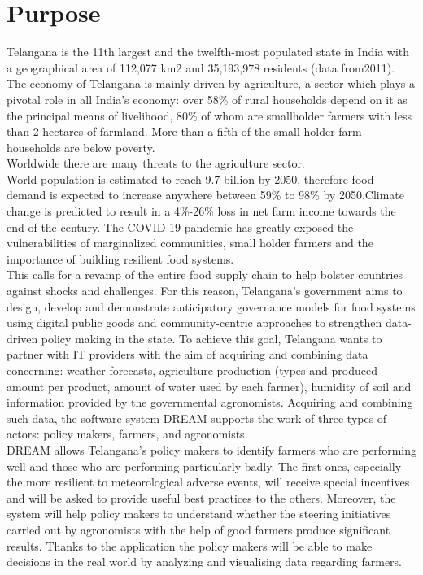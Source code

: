 \section{Purpose}

Telangana is the 11th largest and the twelfth-most populated state in India with a geographical area of 112,077 km2 and 35,193,978 residents (data from2011).
The economy of Telangana is mainly driven by agriculture, a sector which plays a pivotal role in all India’s economy: over 58\% of rural households depend on it as the principal means of livelihood, 80\% of whom are smallholder farmers with less than 2 hectares of farmland. More than a fifth of the small-holder farm households are below poverty. \\

Worldwide there are many threats to the agriculture sector.\\ World population is estimated to reach 9.7 billion by 2050, therefore food demand is expected to increase anywhere between 59\% to 98\% by 2050.Climate change is predicted to result in a 4\%-26\% loss in net farm income towards the end of the century. The COVID-19 pandemic has greatly exposed the vulnerabilities of marginalized communities, small holder farmers and the importance of building resilient food systems.\\

This calls for a revamp of the entire food supply chain to help bolster countries against shocks and challenges. For this reason, Telangana’s government aims to design, develop and demonstrate anticipatory governance models for food systems using digital public goods and community-centric approaches to strengthen data-driven policy making in the state. To achieve this goal, Telangana wants to partner with IT providers with the aim of acquiring and combining data concerning: weather forecasts, agriculture production (types and produced amount per product, amount of water used by each farmer), humidity of soil and information provided by the governmental agronomists. Acquiring and combining such data, the software system DREAM supports the work of three types of actors: policy makers, farmers, and agronomists.\\

DREAM allows Telangana’s policy makers to identify farmers who are performing well and those who are performing particularly badly. The first ones, especially the more resilient to meteorological adverse events, will receive special incentives and will be asked to provide useful best practices to the others. Moreover, the system will help policy makers to understand whether the steering initiatives carried out by agronomists with the help of good farmers produce significant results.
{\color{red} Thanks to the application the policy makers will be able to make decisions in the real world by analyzing and visualising data regarding farmers.}\\

